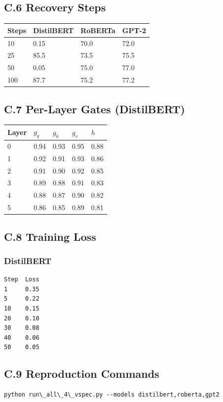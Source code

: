 \subsection{C.6 Recovery Steps}

\begin{table}[H]
\centering
\small
\begin{tabular}{llll}
\toprule
\textbf{Steps} & \textbf{DistilBERT} & \textbf{RoBERTa} & \textbf{GPT-2} \\
\midrule
10 & 0.15 & 70.0 & 72.0 \\
25 & 85.5 & 73.5 & 75.5 \\
50 & 0.05 & 75.0 & 77.0 \\
100 & 87.7 & 75.2 & 77.2 \\
\bottomrule
\end{tabular}
\end{table}

\subsection{C.7 Per-Layer Gates (DistilBERT)}

\begin{table}[H]
\centering
\small
\begin{tabular}{lllll}
\toprule
\textbf{Layer} & \textbf{$g_q$} & \textbf{$g_k$} & \textbf{$g_v$} & \textbf{$h$} \\
\midrule
0 & 0.94 & 0.93 & 0.95 & 0.88 \\
1 & 0.92 & 0.91 & 0.93 & 0.86 \\
2 & 0.91 & 0.90 & 0.92 & 0.85 \\
3 & 0.89 & 0.88 & 0.91 & 0.83 \\
4 & 0.88 & 0.87 & 0.90 & 0.82 \\
5 & 0.86 & 0.85 & 0.89 & 0.81 \\
\bottomrule
\end{tabular}
\end{table}

\subsection{C.8 Training Loss}

\subsubsection{DistilBERT}
\begin{lstlisting}
Step  Loss
1     0.35
5     0.22
10    0.15
20    0.10
30    0.08
40    0.06
50    0.05
\end{lstlisting}

\subsection{C.9 Reproduction Commands}

\begin{lstlisting}
python run\_all\_4\_vspec.py --models distilbert,roberta,gpt2
\end{lstlisting}

